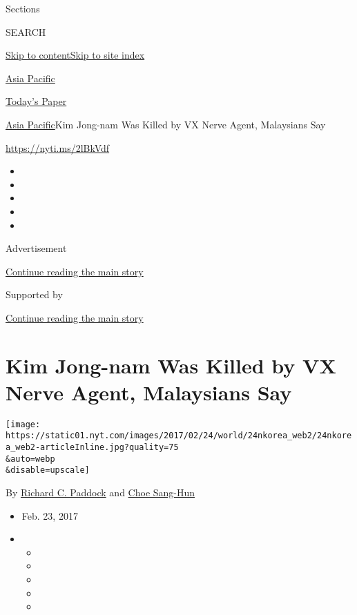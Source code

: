 Sections

SEARCH

\protect\hyperlink{site-content}{Skip to
content}\protect\hyperlink{site-index}{Skip to site index}

\href{https://www.nytimes.com/section/world/asia}{Asia Pacific}

\href{https://myaccount.nytimes.com/auth/login?response_type=cookie\&client_id=vi}{}

\href{https://www.nytimes.com/section/todayspaper}{Today's Paper}

\href{/section/world/asia}{Asia Pacific}\textbar{}Kim Jong-nam Was
Killed by VX Nerve Agent, Malaysians Say

\url{https://nyti.ms/2lBkVdf}

\begin{itemize}
\item
\item
\item
\item
\item
\end{itemize}

Advertisement

\protect\hyperlink{after-top}{Continue reading the main story}

Supported by

\protect\hyperlink{after-sponsor}{Continue reading the main story}

\hypertarget{kim-jong-nam-was-killed-by-vx-nerve-agent-malaysians-say}{%
\section{Kim Jong-nam Was Killed by VX Nerve Agent, Malaysians
Say}\label{kim-jong-nam-was-killed-by-vx-nerve-agent-malaysians-say}}

\texttt{[image: https://static01.nyt.com/images/2017/02/24/world/24nkorea\_web2/24nkorea\_web2-articleInline.jpg?quality=75\\\&auto=webp\\\&disable=upscale]}

By \href{https://www.nytimes.com/by/richard-c-paddock}{Richard C.
Paddock} and \href{http://www.nytimes.com/by/choe-sang-hun}{Choe
Sang-Hun}

\begin{itemize}
\item
  Feb. 23, 2017
\item
  \begin{itemize}
  \item
  \item
  \item
  \item
  \item
  \end{itemize}
\end{itemize}

